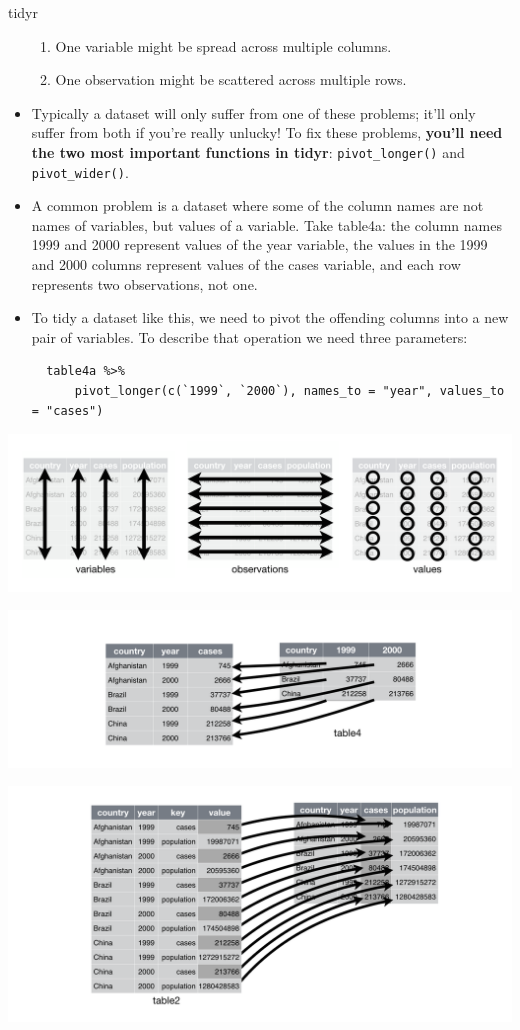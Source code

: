 \documentclass[ignorenonframetext,]{beamer}
\providecommand{\tightlist}{%
  \setlength{\itemsep}{0pt}\setlength{\parskip}{0pt}}
\begin{document}
\begin{frame}[fragile]{tidyr}
\begin{itemize}
  \begin{enumerate}
  \tightlist
  \item
    One variable might be spread across multiple columns.
  \item
    One observation might be scattered across multiple rows.
  \end{enumerate}
\item
  Typically a dataset will only suffer from one of these problems; it'll
  only suffer from both if you're really unlucky! To fix these problems,
  \textbf{you'll need the two most important functions in tidyr}:
  \texttt{pivot\_longer()} and \texttt{pivot\_wider()}.
\item
  A common problem is a dataset where some of the column names are not
  names of variables, but values of a variable. Take table4a: the column
  names 1999 and 2000 represent values of the year variable, the values
  in the 1999 and 2000 columns represent values of the cases variable,
  and each row represents two observations, not one.
\item
  To tidy a dataset like this, we need to pivot the offending columns
  into a new pair of variables. To describe that operation we need three
  parameters:

\begin{verbatim}
  table4a %>%
      pivot_longer(c(`1999`, `2000`), names_to = "year", values_to = "cases")
\end{verbatim}
\end{itemize}

\includegraphics{tidy-1.png}

\includegraphics{tidy-9.png}

\includegraphics{tidy-8.png}


\end{frame}
\end{document}
